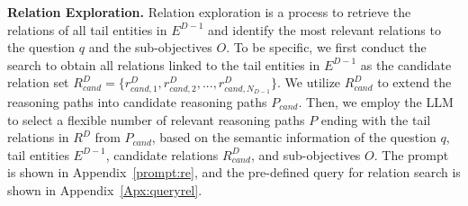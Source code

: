 \documentclass{article}
\begin{document}
\textbf{Relation Exploration.} Relation exploration is a process to retrieve the relations of all tail entities in $E^{D-1}$ and identify the most relevant relations to the question $q$ and the sub-objectives $O$.
To be specific, we first conduct the search to obtain all relations linked to the tail entities in $E^{D-1}$ as the candidate relation set $R^{D}_{cand} = \{r^{D}_{cand,1}, r^{D}_{cand,2}, ..., r^{D}_{cand, N_{D-1}}\}$. 
We utilize $R^{D}_{cand}$ to extend the reasoning paths into candidate reasoning paths $P_{cand}$. 
Then, we employ the LLM to select a flexible number of 
relevant reasoning paths $P$ ending with the tail relations in $R^{D}$ from $P_{cand}$, based on the semantic information of the question $q$, tail entities $E^{D-1}$, candidate relations $R^{D}_{cand}$, and sub-objectives $O$. 
The prompt is shown in Appendix~\ref{prompt:re}, and the pre-defined query for relation search is shown in Appendix~\ref{Apx:queryrel}.


\end{document}
